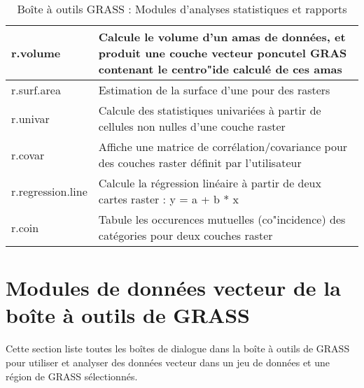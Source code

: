 \begin{table}[H]
\begin{tabular}{|p{4cm}|p{10cm}|}
  \hline r.volume & Calcule le volume d'un amas de données, et produit une couche vecteur poncutel GRAS contenant le centro"ide calculé de ces amas \\
  \hline r.surf.area & Estimation de la surface d'une pour des rasters \\
  \hline r.univar & Calcule des statistiques univariées à partir de cellules non nulles d'une couche raster\\
  \hline r.covar & Affiche une matrice de corrélation/covariance pour des couches raster définit par l'utilisateur\\
  \hline r.regression.line & Calcule la régression linéaire à partir de deux cartes raster : y = a + b * x \\
  \hline r.coin & Tabule les occurences mutuelles (co"incidence) des catégories pour deux couches raster\\
\hline
\end{tabular}
\caption{Boîte à outils GRASS : Modules d'analyses statistiques et rapports}
\end{table}


\section{Modules de données vecteur de la boîte à outils de GRASS}

Cette section liste toutes les boîtes de dialogue dans la boîte à outils de GRASS pour utiliser et analyser des données vecteur dans un jeu de données et une région de GRASS sélectionnés.

